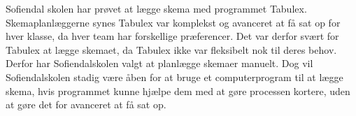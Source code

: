 Sofiendal skolen har prøvet at lægge skema med programmet Tabulex. Skemaplanlæggerne synes Tabulex var komplekst og avanceret at få sat op for hver klasse, da hver team har forskellige præferencer. Det var derfor svært for Tabulex at lægge skemaet, da Tabulex ikke var fleksibelt nok til deres behov. Derfor har Sofiendalskolen valgt at planlægge skemaer manuelt. Dog vil Sofiendalskolen stadig være åben for at bruge et computerprogram til at lægge skema, hvis programmet kunne hjælpe dem med at gøre processen kortere, uden at gøre det for avanceret at få sat op.

